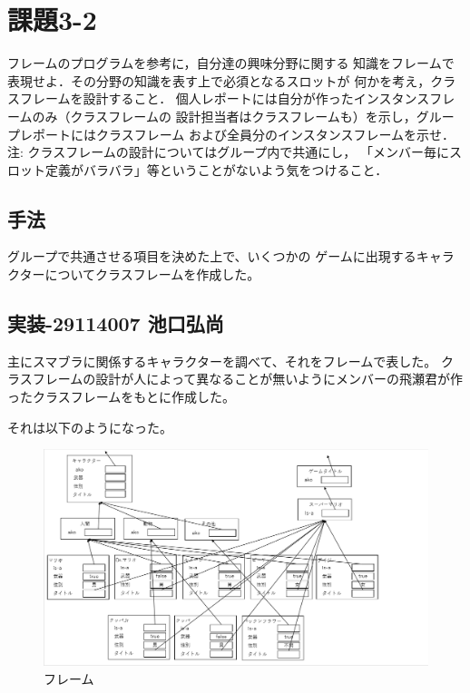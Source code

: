 \documentclass{jarticle}
\begin{document}
\section{課題3-2}
\begin{screen}
    フレームのプログラムを参考に，自分達の興味分野に関する
    知識をフレームで表現せよ．その分野の知識を表す上で必須となるスロットが
    何かを考え，クラスフレームを設計すること．
    個人レポートには自分が作ったインスタンスフレームのみ（クラスフレームの
    設計担当者はクラスフレームも）を示し，グループレポートにはクラスフレーム
    および全員分のインスタンスフレームを示せ．
    \\ 注: クラスフレームの設計についてはグループ内で共通にし，
    「メンバー毎にスロット定義がバラバラ」等ということがないよう気をつけること．
\end{screen}
\subsection{手法}
グループで共通させる項目を決めた上で、いくつかの
ゲームに出現するキャラクターについてクラスフレームを作成した。
\subsection{実装-29114007 池口弘尚}
主にスマブラに関係するキャラクターを調べて、それをフレームで表した。
クラスフレームの設計が人によって異なることが無いようにメンバーの飛瀬君が作ったクラスフレームをもとに作成した。

それは以下のようになった。

\begin{figure}[!hbt]
  \centering
  \includegraphics[bb=0 0 1282 723,width=1.2\linewidth]{007/Frame.png}
  \caption{フレーム}
  \label{fig:Frame}
\end{figure}
\end{document}
